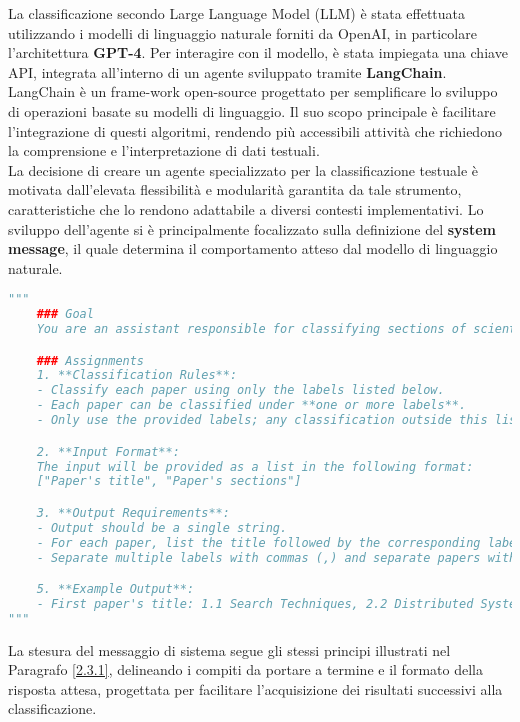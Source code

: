 La classificazione secondo Large Language Model (LLM) è stata effettuata utilizzando i modelli di linguaggio naturale forniti da OpenAI, in particolare l'architettura \textbf{GPT-4}. Per interagire con il modello, è stata impiegata una chiave API, integrata all'interno di un agente sviluppato tramite \textbf{LangChain}. \vspace{7pt} \\
LangChain è un frame-work open-source progettato per semplificare lo sviluppo di operazioni basate su modelli di linguaggio. Il suo scopo principale è facilitare l'integrazione di questi algoritmi, rendendo più accessibili attività che richiedono la comprensione e l'interpretazione di dati testuali. \vspace{7pt} \\
La decisione di creare un agente specializzato per la classificazione testuale è motivata dall'elevata flessibilità e modularità garantita da tale strumento, caratteristiche che lo rendono adattabile a diversi contesti implementativi. Lo sviluppo dell'agente si è principalmente focalizzato sulla definizione del \textbf{system message}, il quale determina il comportamento atteso dal modello di linguaggio naturale.
\begin{lstlisting}[language=Python, caption=System message dell'agente classificatore]
"""
    ### Goal
    You are an assistant responsible for classifying sections of scientific papers into specific labels.

    ### Assignments
    1. **Classification Rules**:
    - Classify each paper using only the labels listed below.
    - Each paper can be classified under **one or more labels**.
    - Only use the provided labels; any classification outside this list is not acceptable.

    2. **Input Format**:
    The input will be provided as a list in the following format: 
    ["Paper's title", "Paper's sections"]  

    3. **Output Requirements**:
    - Output should be a single string.
    - For each paper, list the title followed by the corresponding labels.
    - Separate multiple labels with commas (,) and separate papers with semicolons (;).

    5. **Example Output**:
    - First paper's title: 1.1 Search Techniques, 2.2 Distributed Systems; Second paper's title: 3.2 Middlegame Play, 5.1 Competitive Play
"""
\end{lstlisting}
La stesura del messaggio di sistema segue gli stessi principi illustrati nel Paragrafo \ref{2.3.1}, delineando i compiti da portare a termine e il formato della risposta attesa, progettata per facilitare l'acquisizione dei risultati successivi alla classificazione. \vspace{7pt} \\
